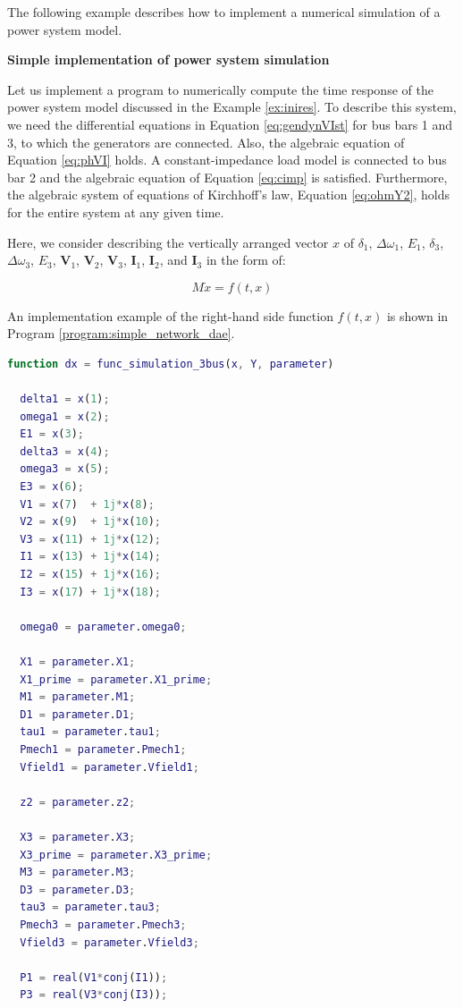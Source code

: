 \documentclass[graybox, envcountchap]{svmult}
\begin{document}
The following example describes how to implement a numerical simulation of a
power system model.

\begin{example}{\textbf{Simple implementation of power system
simulation}\label{ex:dae_ex2}}

Let us implement a program to numerically compute the time response of the power
system model discussed in the Example \ref{ex:inires}. To describe this system,
we need the differential equations in Equation \ref{eq:gendynVIst} for bus bars
1 and 3, to which the generators are connected. Also, the algebraic equation of
Equation \ref{eq:phVI} holds. A constant-impedance load model is connected to
bus bar 2 and the algebraic equation of Equation \ref{eq:cimp} is satisfied.
Furthermore, the algebraic system of equations of Kirchhoff's law, Equation
\ref{eq:ohmY2}, holds for the entire system at any given time.

Here, we consider describing the vertically arranged vector $x$ of $\delta_1$,
$\Delta\omega_1$, $E_1$, $\delta_3$, $\Delta\omega_3$, $E_3$, $\bm V_1$, $\bm
V_2$, $\bm V_3$, $\bm I_1$, $\bm I_2$, and $\bm I_3$ in the form of:

\[
  M\dot{x} = f(t, x)
\]

An implementation example of the right-hand side function $f(t, x)$ is shown in
Program \ref{program:simple_network_dae}.

\begin{lstlisting}[language=Matlab, caption=func\_simulation\_3bus.m, label={program:simple_network_dae}]
function dx = func_simulation_3bus(x, Y, parameter)

  delta1 = x(1);
  omega1 = x(2);
  E1 = x(3);
  delta3 = x(4);
  omega3 = x(5);
  E3 = x(6);
  V1 = x(7)  + 1j*x(8);
  V2 = x(9)  + 1j*x(10);
  V3 = x(11) + 1j*x(12);
  I1 = x(13) + 1j*x(14);
  I2 = x(15) + 1j*x(16);
  I3 = x(17) + 1j*x(18);

  omega0 = parameter.omega0;

  X1 = parameter.X1;
  X1_prime = parameter.X1_prime;
  M1 = parameter.M1;
  D1 = parameter.D1;
  tau1 = parameter.tau1;
  Pmech1 = parameter.Pmech1;
  Vfield1 = parameter.Vfield1;

  z2 = parameter.z2;

  X3 = parameter.X3;
  X3_prime = parameter.X3_prime;
  M3 = parameter.M3;
  D3 = parameter.D3;
  tau3 = parameter.tau3;
  Pmech3 = parameter.Pmech3;
  Vfield3 = parameter.Vfield3;

  P1 = real(V1*conj(I1));
  P3 = real(V3*conj(I3));


\end{lstlisting}
\end{example}
\end{document}
